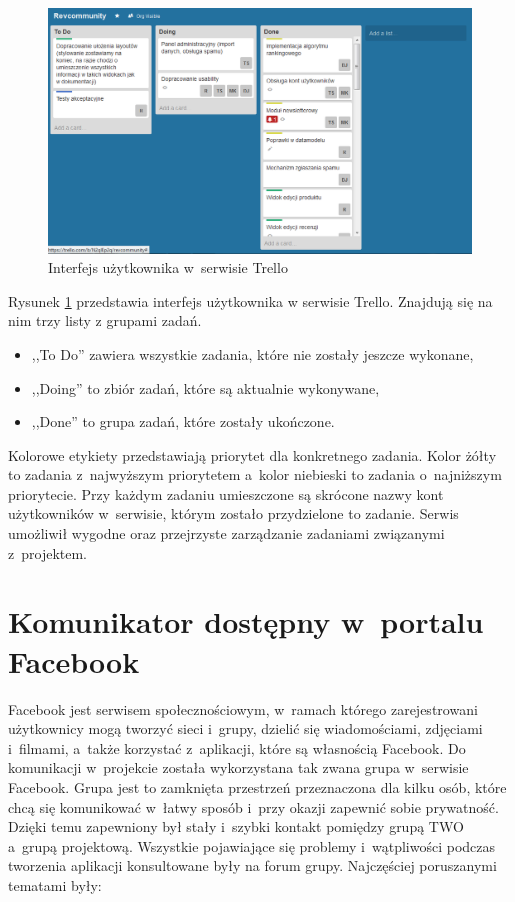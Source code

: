 \begin{figure}[H]
	\centering
	\includegraphics[width=1.00\textwidth]{images/trello.png}
	\caption{Interfejs użytkownika w~serwisie Trello}
	\label{fig:trello}
\end{figure}

Rysunek \ref{fig:trello} przedstawia interfejs użytkownika w serwisie Trello. Znajdują się na nim trzy listy z grupami zadań.

\begin{itemize}
\item ,,To Do'' zawiera wszystkie zadania, które nie zostały jeszcze wykonane,
\item ,,Doing'' to zbiór zadań, które są aktualnie wykonywane,
\item ,,Done'' to grupa zadań, które zostały ukończone.
\end{itemize}


Kolorowe etykiety przedstawiają priorytet dla konkretnego zadania. Kolor żółty to zadania z~najwyższym priorytetem a~kolor niebieski to zadania o~najniższym priorytecie. Przy każdym zadaniu umieszczone są skrócone nazwy kont użytkowników w~serwisie, którym zostało przydzielone to zadanie. 
Serwis umożliwił wygodne oraz przejrzyste zarządzanie zadaniami związanymi z~projektem.

\section{Komunikator dostępny w~portalu Facebook}
Facebook jest serwisem społecznościowym, w~ramach którego zarejestrowani użytkownicy mogą tworzyć sieci i~grupy, dzielić się wiadomościami, zdjęciami i~filmami, a~także korzystać z~aplikacji, które są własnością Facebook. Do komunikacji w~projekcie została wykorzystana tak zwana grupa w~serwisie Facebook. Grupa  jest to zamknięta przestrzeń przeznaczona dla kilku osób, które chcą się komunikować w~łatwy sposób i~przy okazji zapewnić sobie prywatność. Dzięki temu zapewniony był stały i~szybki kontakt pomiędzy grupą TWO a~grupą projektową. Wszystkie pojawiające się problemy i~wątpliwości podczas tworzenia aplikacji konsultowane były na forum grupy. Najczęściej poruszanymi tematami były:

